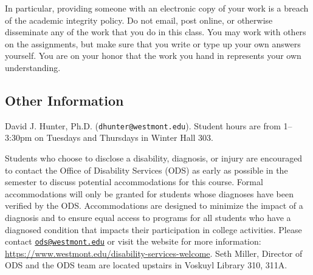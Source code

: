 \documentclass[
  twoside]{article}
\begin{document}
In particular, providing someone with an electronic copy of your work is
a breach of the academic integrity policy. Do not email, post online, or
otherwise disseminate any of the work that you do in this class. You may
work with others on the assignments, but make sure that you write or
type up your own answers yourself. You are on your honor that the work
you hand in represents your own understanding.

\hypertarget{other-information}{%
\subsection{Other Information}\label{other-information}}

\begin{description} \small

\item[Professor:] David J. Hunter, Ph.D.
  (\verb!dhunter@westmont.edu!). Student hours are from 1--3:30pm on Tuesdays and Thursdays in Winter Hall 303.

\item[Accommodations for Students with Disabilities:] Students who choose to disclose a disability, diagnosis, or injury are encouraged to contact the Office of Disability Services (ODS) as early as possible in the semester to discuss potential accommodations for this course. Formal accommodations will only be granted for students whose diagnoses have been verified by the ODS. Accommodations are designed to minimize the impact of a diagnosis and to ensure equal access to programs for all students who have a diagnosed condition that impacts their participation in college activities. Please contact \href{mailto:ods@westmont.edu}{\tt ods@westmont.edu} or visit the website for more information: \url{https://www.westmont.edu/disability-services-welcome}. Seth Miller, Director of ODS and the ODS team are located upstairs in Voskuyl Library 310, 311A. 


\end{description}
\end{document}
